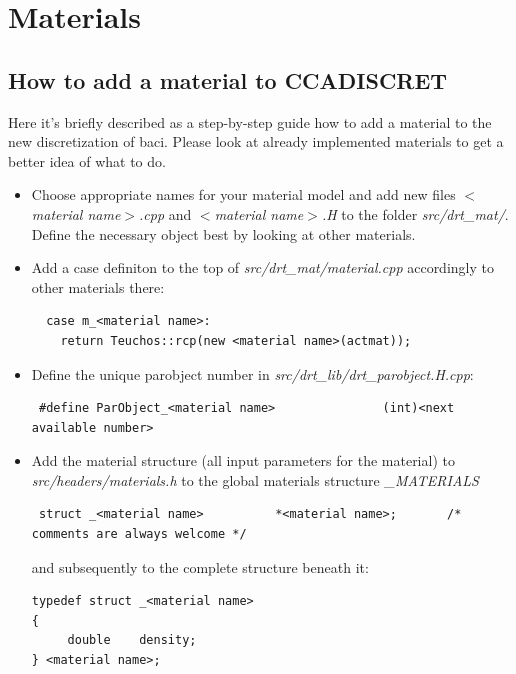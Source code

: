 



\chapter{Materials}

\section{How to add a material to CCADISCRET}
Here it's briefly described as a step-by-step guide how to add a material to the new discretization of baci. Please look at already implemented materials to get a better idea of what to do.

\begin{itemize}
 \item Choose appropriate names for your material model and add new files \textit{$<$material name$>$.cpp} and \textit{$<$material name$>$.H} to the folder \textit{src/drt\_mat/}. Define the necessary object best by looking at other materials.

\item Add a case definiton to the top of \textit{src/drt\_mat/material.cpp} accordingly to other materials there:
\begin{verbatim}
  case m_<material name>:
    return Teuchos::rcp(new <material name>(actmat));
\end{verbatim}

\item Define the unique parobject number in \textit{src/drt\_lib/drt\_parobject.H.cpp}:
\begin{verbatim}
 #define ParObject_<material name>               (int)<next available number>
\end{verbatim}

\item Add the material structure (all input parameters for the material) to \textit{src/headers/materials.h} to the global materials structure \textit{\_MATERIALS} 
\begin{verbatim}
 struct _<material name>          *<material name>;       /* comments are always welcome */
\end{verbatim}
and subsequently to the complete structure beneath it:
\begin{verbatim}
typedef struct _<material name>
{
     double	   density;
} <material name>;
\end{verbatim}


\end{itemize}
